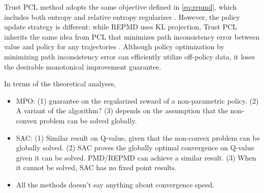 Trust PCL method adopts the same objective defined in \cref{eq:repmd}, which includes both entropy and relative entropy regularizer \citep{nachum2017trust}. However, the policy update strategy is different: while REPMD uses KL projection, Trust PCL inherits the same idea from PCL that minimizes path inconsistency error between value and policy for any trajectories \citep{nachum2017bridging}. Although policy optimization by minimizing path inconsistency error can efficiently utilize off-policy data, it loses the desirable monotonical improvement guarantee.

In terms of the theoretical analyses, 
\begin{itemize}
	\item MPO: (1) guarantee on the regularized reward of a non-parametric policy. (2) A variant of the algorithm? (3) depends on the assumption that the non-convex problem can be solved globally.
	\item SAC: (1) Similar result on Q-value, given that the non-convex problem can be globally solved. (2) SAC proves the globally optimal convergence on Q-value given it can be solved. PMD/REPMD can achieve a similar result. (3) When it cannot be solved, SAC has no fixed point results.
	\item All the methods doesn't say anything about convergence speed.
\end{itemize}






